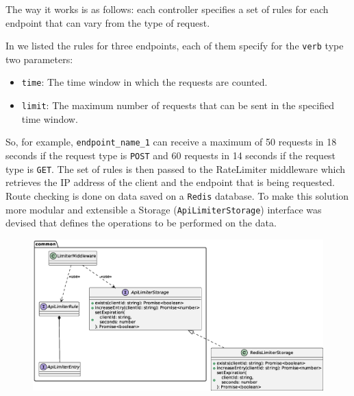 \documentclass{scrartcl}
\begin{document}
The way it works is as follows: each controller specifies a set of rules for each endpoint that can vary from the type of request.


In  we listed the rules for three endpoints, each of them specify for the \texttt{verb} type two parameters:
\begin{itemize}
    \item \texttt{time}: The time window in which the requests are counted.
    \item \texttt{limit}: The maximum number of requests that can be sent in the specified time window.
\end{itemize}

So, for example, \texttt{endpoint\_name\_1} can receive a maximum of 50 requests in 18 seconds if the request type is \texttt{POST} and 60 requests in 14 seconds if the request type is \texttt{GET}.
The set of rules is then passed to the RateLimiter middleware which retrieves the IP address of the client and the endpoint that is being requested. 
Route checking is done on data saved on a \texttt{Redis} database. To make this solution more modular and extensible a Storage (\texttt{ApiLimiterStorage}) interface was devised that defines the operations to be performed on the data. 


\begin{figure}
    \centering
    \includegraphics[width=\linewidth]{figures/api-limiter-api.eps}
    \label{fig:api-limiter-api} 
\end{figure}
\end{document}
